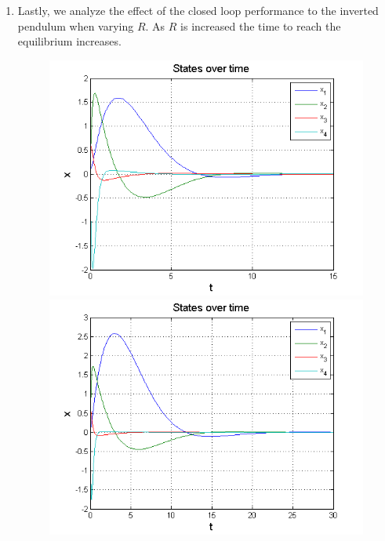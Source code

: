 \documentclass[10pt]{article}
\begin{document}
\begin{enumerate}[leftmargin=*]
    \item Lastly, we analyze the effect of the closed loop performance to the inverted pendulum when varying $R$.  As $R$ is increased the time to reach the equilibrium increases.
        
        \begin{figure}[H]
            \centering
            \begin{minipage}{.5\textwidth}
              \centering
              \includegraphics[width=1.\linewidth]{Ris10.png}
              \captionsetup{width=0.8\textwidth}
            \end{minipage}%
            \begin{minipage}{.5\textwidth}
              \centering
              \includegraphics[width=1.\linewidth]{Ris100.png}
            \end{minipage}
         \end{figure}
         
\end{enumerate}
\end{document}
